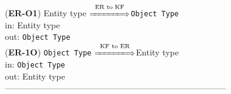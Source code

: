 \documentclass[sn-mathphys]{sn-jnl}
\begin{document}
{{%

({\bf ER-O1}) Entity type $\overset{\text{ER to KF}}{\xLongrightarrow{\hspace*{1.4cm}}}${\tt Object Type}\\
\hspace*{0.3cm}in: Entity type\\
\hspace*{0.5cm}out: {\tt Object Type}\\

({\bf ER-1O}) {\tt Object Type} $\overset{\text{KF to ER}}{\xLongrightarrow{\hspace*{1.4cm}}}${Entity type}\\
\hspace*{0.3cm}in: {\tt Object Type}\\
\hspace*{0.5cm}out: {Entity type}\\

------------------------------------------------------------------------------
\\ \



}}
\end{document}
